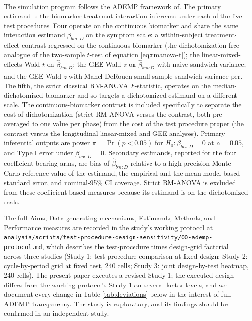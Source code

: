 \documentclass[
  11pt,
]{article}
\begin{document}
The simulation program follows the ADEMP framework of\textsuperscript{}. The primary estimand is the biomarker-treatment
interaction inference under each of the five test procedures.
Four operate on the continuous biomarker and share the same
interaction estimand \(\beta_{bm:D}\) on the symptom scale: a
within-subject treatment-effect contrast regressed on the
continuous biomarker (the dichotomization-free analogue of the
two-sample \(t\)-test of equation \eqref{eq:rmanova-t}); the
linear-mixed-effects Wald \(t\) on \(\hat{\beta}_{bm:D}\); the GEE
Wald \(z\) on \(\hat{\beta}_{bm:D}\) with naive sandwich variance;
and the GEE Wald \(z\) with Mancl-DeRouen small-sample sandwich
variance per\textsuperscript{}. The fifth, the strict
classical RM-ANOVA \(F\)-statistic, operates on the
median-dichotomized biomarker and so targets a dichotomized
estimand on a different scale. The continuous-biomarker contrast
is included specifically to separate the cost of dichotomization
(strict RM-ANOVA versus the contrast, both pre-averaged to one
value per phase) from the cost of the test procedure proper (the
contrast versus the longitudinal linear-mixed and GEE analyses).
Primary inferential outputs are power \(\pi = \Pr(p < 0.05)\) for
\(H_0: \beta_{bm:D} = 0\) at \(\alpha = 0.05\), and Type I error
under \(\beta_{bm:D} = 0\). Secondary estimands, reported for the
four coefficient-bearing arms, are bias of \(\hat{\beta}_{bm:D}\)
relative to a high-precision Monte-Carlo reference value of the
estimand, the empirical and the mean model-based standard error,
and nominal-95\% CI coverage. Strict RM-ANOVA is excluded from
these coefficient-based measures because its estimand is on the
dichotomized scale.

The full Aims, Data-generating mechanisms, Estimands, Methods,
and Performance measures are recorded in the study's working
protocol at
\texttt{analysis/scripts/test-procedure-design-sensitivity/00-ademp-protocol.md},
which describes the test-procedure times design-grid factorial
across three studies (Study 1: test-procedure comparison at fixed
design; Study 2: cycle-by-period grid at fixed test, 240 cells;
Study 3: joint design-by-test heatmap, 240 cells). The present
paper executes a revised Study 1; the executed design differs
from the working protocol's Study 1 on several factor levels, and
we document every change in Table \ref{tab:deviations} below in
the interest of full ADEMP transparency. The study is
exploratory, and its findings should be confirmed in an
independent study.
\end{document}
